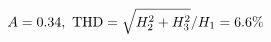 \documentclass[preview]{standalone}
\begin{document}
\begin{align*}
\special{dvisvgm:raw <g id='unique000'>}A=0.34,\ \text{THD}=\sqrt{H_2^2+H_3^2}/H_1=6.6\%\special{dvisvgm:raw </g>}
\end{align*}
\end{document}
